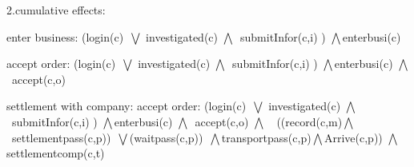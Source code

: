\documentclass[runningheads]{llncs}
\begin{document}
2.cumulative effects:


enter business: (login(c)\ $\bigvee$ investigated(c) $\bigwedge$\ submitInfor(c,i) ) $\bigwedge$enterbusi(c)

accept order: (login(c)\ $\bigvee$ investigated(c) $\bigwedge$\ submitInfor(c,i) ) $\bigwedge$enterbusi(c) $\bigwedge$\  accept(c,o)

settlement with company: accept order: (login(c)\ $\bigvee$ investigated(c) $\bigwedge$\ submitInfor(c,i) ) $\bigwedge$enterbusi(c) $\bigwedge$\  accept(c,o) $\bigwedge$\ \ ((record(c,m)$\bigwedge$\ settlementpass(c,p))\ $\bigvee$(waitpass(c,p))\ $\bigwedge$transportpass(c,p)$\bigwedge$Arrive(c,p)) $\bigwedge$settlementcomp(c,t)
\end{document}
